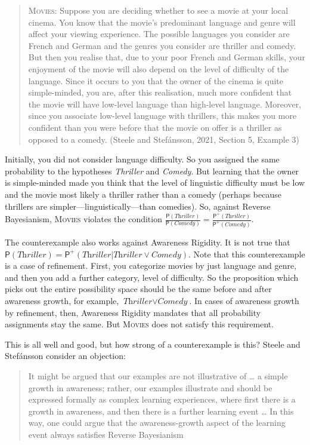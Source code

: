 \documentclass[
  11pt,
  dvipsnames,enabledeprecatedfontcommands]{scrartcl}
\newcommand{\pr}[1]{\ensuremath{\mathsf{P}(#1)}}
\newcommand{\ppr}[2]{\ensuremath{\mathsf{P}^{#1}(#2)}}
\begin{document}
\begin{quote}
\textsc{Movies}: Suppose you are deciding whether to see a movie at your
local cinema. You know that the movie's predominant language and genre
will affect your viewing experience. The possible languages you consider
are French and German and the genres you consider are thriller and
comedy. But then you realise that, due to your poor French and German
skills, your enjoyment of the movie will also depend on the level of
difficulty of the language. Since it occurs to you that the owner of the
cinema is quite simple-minded, you are, after this realisation, much
more confident that the movie will have low-level language than
high-level language. Moreover, since you associate low-level language
with thrillers, this makes you more confident than you were before that
the movie on offer is a thriller as opposed to a comedy. (Steele and
Stefánsson, 2021, Section 5, Example 3)
\end{quote}

\noindent Initially, you did not consider language difficulty. So you
assigned the same probability to the hypotheses \textit{Thriller} and
\textit{Comedy}. But learning that the owner is simple-minded made you
think that the level of linguistic difficulty must be low and the movie
most likely a thriller rather than a comedy (perhaps because thrillers
are simpler---linguistically---than comedies). So, against Reverse
Bayesianism, \textsc{Movies} violates the condition
\(\frac{\pr{\textit{Thriller}}}{\pr{\textit{Comedy}}}=\frac{\ppr{+}{\textit{Thriller}}}{\ppr{+}{\textit{Comedy}}}\).

The counterexample also works against Awareness Rigidity. It is not true
that
\(\pr{\textit{Thriller}}=\ppr{+}{\textit{Thriller} \vert \textit{Thriller}\vee \textit{Comedy}}\).
Note that this counterexample is a case of refinement. First, you
categorize movies by just language and genre, and then you add a further
category, level of difficulty. So the proposition which picks out the
entire possibility space should be the same before and after awareness
growth, for example, \(\textit{Thriller}\vee \textit{Comedy}\). In cases
of awareness growth by refinement, then, Awareness Rigidity mandates
that all probability assignments stay the same. But \textsc{Movies} does
not satisfy this requirement.

This is all well and good, but how strong of a counterexample is this?
Steele and Stefánsson consider an objection:

\begin{quote}
It might be argued that our examples are not illustrative of \ldots{} a
simple growth in awareness; rather, our examples illustrate and should
be expressed formally as complex learning experiences, where first there
is a growth in awareness, and then there is a further learning event
\ldots{} In this way, one could argue that the awareness-growth aspect
of the learning event always satisfies Reverse Bayesianism
\end{quote}
\end{document}
